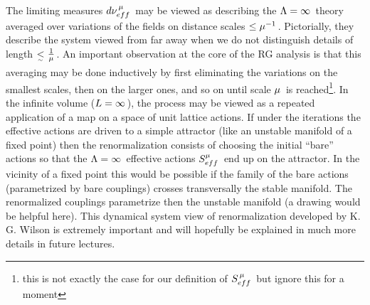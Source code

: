 The limiting measures \s$d\nu_{eff}^{\hspace{0.05cm}\mu}\hspace{0.05cm}$ may be viewed
as describing the \s$\Lambda=\infty\hspace{0.05cm}$ theory averaged over
variations of the fields on distance scales \s$\leq\mu^{-1}\hspace{0.05cm}$.
Pictorially, they describe the system viewed from far away
when we do not distinguish details of length $\mathop{<}\limits_{^\sim}
\hspace{0.05cm}{1\over\mu}\hspace{0.05cm}$. \s
An important observation at the core of the RG analysis
is that this averaging may be done inductively by first
eliminating the variations on the smallest scales, then
on the larger ones, and so on until scale \s$\mu\hspace{0.05cm}$ is
reached\footnote{this is not exactly the case for
our definition of \s$S_{eff}^{\hspace{0.05cm}\mu}\hspace{0.05cm}$ but ignore
this for a moment}. In the infinite volume
(\s$L=\infty\hspace{0.05cm}$), the process
may be viewed as a repeated application of a map
on a space of unit lattice actions. If under the iterations
the effective actions are driven to a simple attractor
(like an unstable manifold of a fixed point) then the
renormalization consists of choosing the initial
``bare'' actions so that the \s$\Lambda=\infty\hspace{0.05cm}$ effective
actions \s$S_{eff}^{\mu}\hspace{0.05cm}$ end up on the attractor.
In the vicinity of a fixed point this would be possible
if the family of the bare actions (parametrized by
bare couplings) crosses transversally the stable manifold.
The renormalized couplings parametrize then the unstable
manifold (a drawing would be helpful here).
This dynamical system view of renormalization developed
by K. G. Wilson is extremely important and will hopefully
be explained in much more details in future lectures.
\vskip 0.3cm


